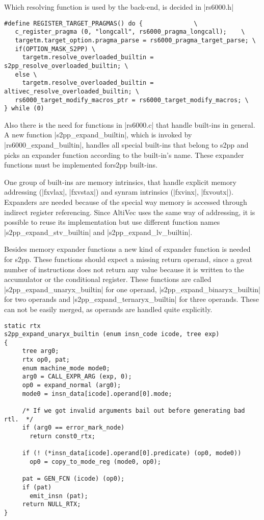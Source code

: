Which resolving function is used by the back-end, is decided in |rs6000.h|
\begin{lstlisting}
#define REGISTER_TARGET_PRAGMAS() do {              \
   c_register_pragma (0, "longcall", rs6000_pragma_longcall);    \
   targetm.target_option.pragma_parse = rs6000_pragma_target_parse; \
   if(OPTION_MASK_S2PP) \
     targetm.resolve_overloaded_builtin = s2pp_resolve_overloaded_builtin; \
   else \
     targetm.resolve_overloaded_builtin = altivec_resolve_overloaded_builtin; \
   rs6000_target_modify_macros_ptr = rs6000_target_modify_macros; \
} while (0)
\end{lstlisting}

Also there is the need for functions in |rs6000.c| that handle built-ins in general.
A new function |s2pp_expand_builtin|, which is invoked by |rs6000_expand_builtin|, handles all special built-ins that belong to s2pp and picks an expander function according to the built-in's name.
These expander functions must be implemented for\ac{s2pp} built-ins.

One group of built-ins are memory intrinsics, that handle explicit memory addressing (|fxvlax|, |fxvstax|) and synram intrinsics (|fxvinx|, |fxvoutx|).
Expanders are needed because of the special way memory is accessed through indirect register referencing.
Since AltiVec uses the same way of addressing, it is possible to reuse its implementation but use different function names |s2pp_expand_stv_builtin| and |s2pp_expand_lv_builtin|.

Besides memory expander functions a new kind of expander function is needed for \ac{s2pp}.
These functions should expect a missing return operand, since a great number of instructions does not return any value because it is written to the accumulator or the conditional register.
These functions are called |s2pp_expand_unaryx_builtin| for one operand, |s2pp_expand_binaryx_builtin| for two operands and |s2pp_expand_ternaryx_builtin| for three operands.
These can not be easily merged, as operands are handled quite explicitly.
\begin{lstlisting}
static rtx
s2pp_expand_unaryx_builtin (enum insn_code icode, tree exp)
{
     tree arg0;
     rtx op0, pat;
     enum machine_mode mode0;
     arg0 = CALL_EXPR_ARG (exp, 0);
     op0 = expand_normal (arg0);
     mode0 = insn_data[icode].operand[0].mode;

     /* If we got invalid arguments bail out before generating bad rtl.  */
     if (arg0 == error_mark_node)
       return const0_rtx;

     if (! (*insn_data[icode].operand[0].predicate) (op0, mode0))
       op0 = copy_to_mode_reg (mode0, op0);

     pat = GEN_FCN (icode) (op0);
     if (pat)
       emit_insn (pat);
     return NULL_RTX;
}
\end{lstlisting}

